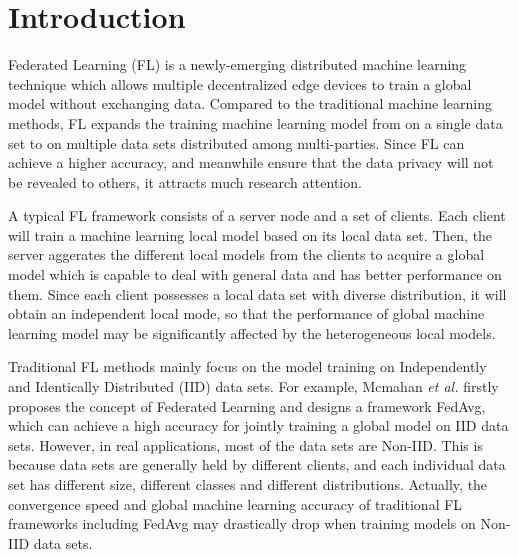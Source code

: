 \documentclass[conference]{IEEEtran}
\begin{document}
\section{Introduction}
Federated Learning (FL) is a newly-emerging distributed machine 
learning technique which allows multiple decentralized edge
devices to train a global model without exchanging data\cite{mcmahan2017communication}. 
Compared to the traditional machine learning methods,
 FL expands the training machine learning model from on a single data set to on
multiple data sets distributed among multi-parties. Since FL can 
achieve a higher accuracy, and meanwhile ensure that the data privacy will not be revealed to others,
it attracts much research attention.

A typical FL framework consists of a 
server node and a set of clients. Each client will train
a machine learning local model based on its local data set.  
Then, the server aggerates the different local
models from the clients to acquire a global model which 
is capable to deal with general data and has better performance on them.
Since each client possesses a local data set
with diverse distribution, it will obtain an independent local mode, 
so that the performance of global machine learning model may be 
significantly affected by the heterogeneous local models.

Traditional FL methods mainly focus on the model training on 
Independently and Identically 
Distributed (IID) data sets. For example,
Mcmahan \textit{et al.} firstly 
proposes the concept of Federated Learning and designs a
framework FedAvg\cite{mcmahan2017communication}, which can 
achieve a high accuracy for jointly training a global model on IID data sets. 
However, in real applications, most of the data sets are
 Non-IID. This is because data sets are generally held by different
clients, and each individual data set has different size, 
different classes and different distributions. Actually,
the convergence speed and global machine learning accuracy of 
 traditional FL frameworks including FedAvg may drastically drop
  when training models on Non-IID data sets. 
\end{document}
